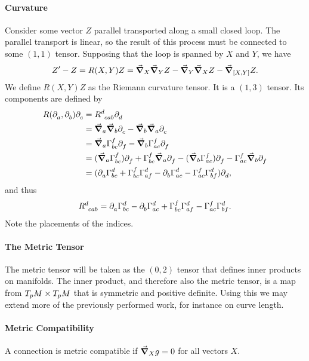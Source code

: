 \paragraph{Curvature}
Consider some vector $Z$ parallel transported along a small closed loop. The parallel transport is linear, so the result of this process must be connected to some $(1, 1)$ tensor. Supposing that the loop is spanned by $X$ and $Y$, we have
\begin{align*}
	Z^{\prime} - Z = R(X, Y)Z = \dcov{X}{\dcov{Y}{Z}} - \dcov{Y}{\dcov{X}{Z}} - \dcov{\comm{X}{Y}}{Z}.
\end{align*}
We define $R(X, Y)Z$ as the Riemann curvature tensor. It is a $(1, 3)$ tensor. Its components are defined by
\begin{align*}
	R(\del{}{a}{}, \del{}{b}{})\del{}{c}{} &= \tensor{R}{^{d}_{cab}}\del{}{d}{} \\
	                                 &= \dcov{a}{\dcov{b}{\del{}{c}{}}} - \dcov{b}{\dcov{a}{\del{}{c}{}}} \\
	                                 &= \dcov{a}{\chris{f}{b}{c}\del{}{f}{}} - \dcov{b}{\chris{f}{a}{c}\del{}{f}{}} \\
	                                 &= (\dcov{a}{\chris{f}{b}{c}})\del{}{f}{} + \chris{f}{b}{c}\dcov{a}{\del{}{f}{}} - (\dcov{b}{\chris{f}{a}{c}})\del{}{f}{} - \chris{f}{a}{c}\dcov{b}{\del{}{f}{}} \\
	                                 &= (\del{}{a}{\chris{d}{b}{c}} + \chris{f}{b}{c}\chris{d}{a}{f} - \del{}{b}{\chris{d}{a}{c}} - \chris{f}{a}{c}\chris{d}{b}{f})\del{}{d}{}, 
\end{align*}
and thus
\begin{align*}
	\tensor{R}{^{d}_{cab}} = \del{}{a}{\chris{d}{b}{c}} - \del{}{b}{\chris{d}{a}{c}} + \chris{f}{b}{c}\chris{d}{a}{f} - \chris{f}{a}{c}\chris{d}{b}{f}.
\end{align*}
Note the placements of the indices.

\paragraph{The Metric Tensor}
The metric tensor will be taken as the $(0, 2)$ tensor that defines inner products on manifolds. The inner product, and therefore also the metric tensor, is a map from $T_{p}M\times T_{p}M$ that is symmetric and positive definite. Using this we may extend more of the previously performed work, for instance on curve length.

\paragraph{Metric Compatibility}
A connection is metric compatible if $\grad_{X}{g} = 0$ for all vectors $X$.

